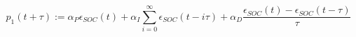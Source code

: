 \begin{equation}
	p_1(t+\tau) := \alpha_P \epsilon_{SOC}(t) + \alpha_I \sum_{i=0}^\infty \epsilon_{SOC}(t-i\tau) + \alpha_D \frac{\epsilon_{SOC}(t)-\epsilon_{SOC}(t-\tau)}{\tau}
	\label{ch2:equ:corrective-component-soc}
\end{equation}